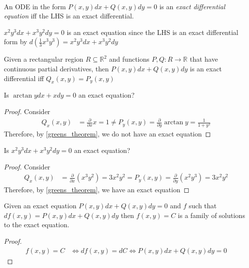 \documentclass[notes]{subfiles}
\begin{document}
\begin{definition} ~\par
    An ODE in the form $P(x, y)dx + Q(x, y)dy = 0$ is an \textit{exact differential equation} iff the LHS is an exact differential.
\end{definition}

\begin{example}
    $x^2 y^3 dx + x^3 y^2 dy = 0$ is an exact equation since the LHS is an exact differential form by $d\left(\frac{1}{3}x^3 y^3\right) = x^2 y^3 dx + x^3 y^2 dy$
\end{example}

\begin{theorem} \label{greens_theorem}
    Given a rectangular region $R \subseteq \mathbb{R}^2$ and functions $P, Q\colon R \to \mathbb{R}$ that have continuous partial derivatives, then $P(x, y)dx + Q(x, y)dy$ is an exact differential iff $Q_x(x, y) = P_y(x, y)$
\end{theorem}

\begin{exercise}
    Is $\arctan y dx + x dy = 0$ an exact equation?
\end{exercise}
\begin{proof}
    Consider
    \begin{align*}
        Q_x(x, y)
        &= \frac{\partial}{\partial x} x
        = 1
        \neq P_y(x, y)
        = \frac{\partial}{\partial y} \arctan y
        = \frac{1}{1 + y^2}
    \end{align*}
    Therefore, by \cref{greens_theorem}, we do not have an exact equation
\end{proof}

\begin{exercise}
    Is $x^2 y^3 dx + x^3 y^2 dy = 0$ an exact equation?
\end{exercise}
\begin{proof}
    Consider
    \begin{align*}
        Q_x(x, y)
        &= \frac{\partial}{\partial x} (x^3 y^2)
        = 3 x^2 y^2
        = P_y(x, y)
        = \frac{\partial}{\partial y} (x^2 y^3)
        = 3 x^2 y^2
    \end{align*}
    Therefore, by \cref{greens_theorem}, we have an exact equation
\end{proof}

\begin{lemma} \label{exact_eq_sol}
    Given an exact equation $P(x, y)dx + Q(x, y)dy = 0$ and $f$ such that $df(x, y) = P(x, y)dx + Q(x, y)dy$ then $f(x, y) = C$ is a family of solutions to the exact equation.
\end{lemma}
\begin{proof}
    \begin{align*}
        f(x, y) = C
        &\iff df(x, y) = dC
        \iff P(x, y)dx + Q(x, y)dy = 0
    \end{align*}
\end{proof}
\end{document}
